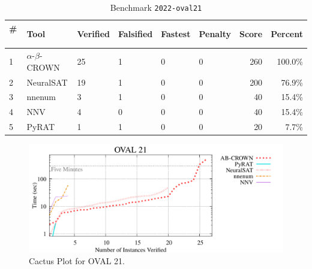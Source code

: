 
\begin{table}[h]
\begin{center}
\caption{Benchmark \texttt{2022-oval21}} \label{tab:cat_{cat}}
{\setlength{\tabcolsep}{2pt}
\begin{tabular}[h]{@{}llllllrr@{}}
\toprule
\textbf{\# ~} & \textbf{Tool} & \textbf{Verified} & \textbf{Falsified} & \textbf{Fastest} & \textbf{Penalty} & \textbf{Score} & \textbf{Percent}\\
\midrule
1 & $\alpha$-$\beta$-CROWN & 25 & 1 & 0 & 0 & 260 & 100.0\% \\
2 & NeuralSAT & 19 & 1 & 0 & 0 & 200 & 76.9\% \\
3 & nnenum & 3 & 1 & 0 & 0 & 40 & 15.4\% \\
4 & NNV & 4 & 0 & 0 & 0 & 40 & 15.4\% \\
5 & PyRAT & 1 & 1 & 0 & 0 & 20 & 7.7\% \\
\bottomrule
\end{tabular}
}
\end{center}
\end{table}



\begin{figure}[h]
\centerline{\includegraphics[width=\textwidth]{cactus/2022_oval21.pdf}}
\caption{Cactus Plot for OVAL 21.}
\label{fig:quantPic}
\end{figure}



